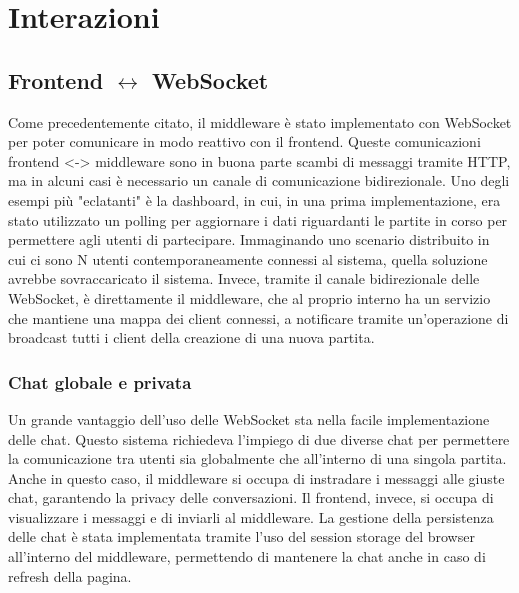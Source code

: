 \chapter{Interazioni}
\label{ch:interazioni} %

\section{Frontend $ \leftrightarrow $ WebSocket} 

Come precedentemente citato, il middleware è stato implementato con WebSocket per poter comunicare in modo reattivo con il frontend. Queste comunicazioni frontend <-> middleware sono in buona parte scambi di messaggi tramite HTTP, ma in alcuni casi è necessario un canale di comunicazione bidirezionale. Uno degli esempi più "eclatanti" è la dashboard, in cui, in una prima implementazione, era stato utilizzato un polling per aggiornare i dati riguardanti le partite in corso per permettere agli utenti di partecipare. Immaginando uno scenario distribuito in cui ci sono N utenti contemporaneamente connessi al sistema, quella soluzione avrebbe sovraccaricato il sistema. Invece, tramite il canale bidirezionale delle WebSocket, è direttamente il middleware, che al proprio interno ha un servizio che mantiene una mappa dei client connessi, a notificare tramite un'operazione di broadcast tutti i client della creazione di una nuova partita.

\subsection{Chat globale e privata}

Un grande vantaggio dell'uso delle WebSocket sta nella facile implementazione delle chat. Questo sistema richiedeva l'impiego di due diverse chat per permettere la comunicazione tra utenti sia globalmente che all'interno di una singola partita. 
Anche in questo caso, il middleware si occupa di instradare i messaggi alle giuste chat, garantendo la privacy delle conversazioni. Il frontend, invece, si occupa di visualizzare i messaggi e di inviarli al middleware. La gestione della persistenza delle chat è stata implementata tramite l'uso del session storage del browser all'interno del middleware, permettendo di mantenere la chat anche in caso di refresh della pagina.

